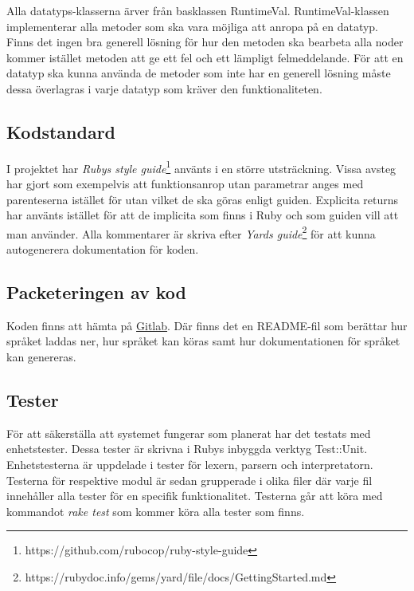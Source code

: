 \documentclass{TDP003mall}
\begin{document}
Alla datatyps-klasserna ärver från basklassen RuntimeVal. 
RuntimeVal-klassen implementerar alla metoder som ska vara möjliga att anropa på en datatyp.
Finns det ingen bra generell lösning för hur den metoden ska bearbeta alla noder kommer istället metoden att ge ett fel och ett lämpligt felmeddelande.
För att en datatyp ska kunna använda de metoder som inte har en generell lösning måste dessa överlagras i varje datatyp som kräver den funktionaliteten.

\subsection{Kodstandard}
I projektet har \emph{Rubys style guide}\footnote{https://github.com/rubocop/ruby-style-guide} använts i en större utsträckning. Vissa avsteg har gjort som exempelvis att funktionsanrop utan parametrar anges med parenteserna istället för utan vilket de ska göras enligt guiden. Explicita returns har använts istället för att de implicita som finns i Ruby och som guiden vill att man använder. Alla kommentarer är skriva efter \emph{Yards guide}\footnote{https://rubydoc.info/gems/yard/file/docs/GettingStarted.md} för att kunna autogenerera dokumentation för koden.

\subsection{Packeteringen av kod}
Koden finns att hämta på \href{https://gitlab.liu.se/albda746/tdp019}{Gitlab}.
Där finns det en README-fil som berättar hur språket laddas ner, hur språket kan köras samt hur dokumentationen för språket kan genereras.

\subsection{Tester}
För att säkerställa att systemet fungerar som planerat har det testats med enhetstester.
Dessa tester är skrivna i Rubys inbyggda verktyg Test::Unit.
Enhetstesterna är uppdelade i tester för lexern, parsern och interpretatorn.
Testerna för respektive modul är sedan grupperade i olika filer där varje fil innehåller alla tester för en specifik funktionalitet.
Testerna går att köra med kommandot \emph{rake test} som kommer köra alla tester som finns.

\newpage
\end{document}
